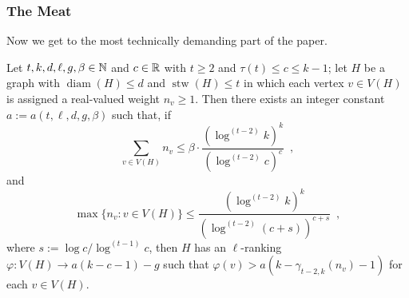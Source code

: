 \documentclass[kpfonts]{patmorin}
\DeclareMathOperator{\diam}{diam}
\DeclareMathOperator{\stw}{stw}
\newcommand{\trn}{\chi_2}
\theoremstyle{named}
\newcommand{\weirdref}[2]{\cref{#1}#2}
\begin{document}
\subsubsection{The Meat}

%


Now we get to the most technically demanding part of the paper.


\begin{lem}\label{t-tree-slack}
Let $t,k,d,\ell,g,\beta\in\mathbb{N}$ and $c\in\mathbb{R}$ with $t\ge 2$ and $\tau(t)\le c\le k-1$; let $H$ be a graph with $\diam(H)\le d$ and $\stw(H)\le t$ in which each vertex $v\in V(H)$ is assigned a real-valued weight $n_v\ge 1$. Then there exists an integer constant $a:=a(t,\ell,d,g,\beta)$ such that, if
\begin{equation}
     \sum_{v\in V(H)} n_v \le \beta\cdot\frac{(\log^{(t-2)} k)^k}{(\log^{(t-2)} c)^{c}} \enspace ,
 \label{total-weight}
\end{equation}
and
\begin{equation}
     \max\{n_v:v\in V(H)\} \le \frac{(\log^{(t-2)} k)^k}{(\log^{(t-2)} (c+s))^{c+s}} \enspace ,
 \label{max-weight}
\end{equation}
where $s := \log c/\log^{(t-1)} c$,
then $H$ has an $\ell$-ranking $\varphi:V(H)\to a(k-c-1)-g$ such that $\varphi(v)> a(k-\gamma_{t-2,k}(n_v)-1)$ for each $v\in V(H)$.
\end{lem}
\end{document}
